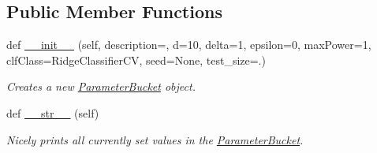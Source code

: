 \subsection*{Public Member Functions}
\begin{DoxyCompactItemize}
\item 
def \hyperlink{classteaspoon_1_1_m_l_1_1tents_1_1_parameter_bucket_a3134297e20272c91ac6ab54a92efb6e5}{\+\_\+\+\_\+init\+\_\+\+\_\+} (self, description=\textquotesingle{}\textquotesingle{}, d=10, delta=1, epsilon=0, max\+Power=1, clf\+Class=Ridge\+Classifier\+CV, seed=None, test\+\_\+size=.)
\begin{DoxyCompactList}\small\item\em Creates a new \hyperlink{classteaspoon_1_1_m_l_1_1tents_1_1_parameter_bucket}{Parameter\+Bucket} object. \end{DoxyCompactList}\item 
def \hyperlink{classteaspoon_1_1_m_l_1_1tents_1_1_parameter_bucket_a39e9d1148208dce4a8dec9354afb789d}{\+\_\+\+\_\+str\+\_\+\+\_\+} (self)\hypertarget{classteaspoon_1_1_m_l_1_1tents_1_1_parameter_bucket_a39e9d1148208dce4a8dec9354afb789d}{}\label{classteaspoon_1_1_m_l_1_1tents_1_1_parameter_bucket_a39e9d1148208dce4a8dec9354afb789d}

\begin{DoxyCompactList}\small\item\em Nicely prints all currently set values in the \hyperlink{classteaspoon_1_1_m_l_1_1tents_1_1_parameter_bucket}{Parameter\+Bucket}. \end{DoxyCompactList}\end{DoxyCompactItemize}
